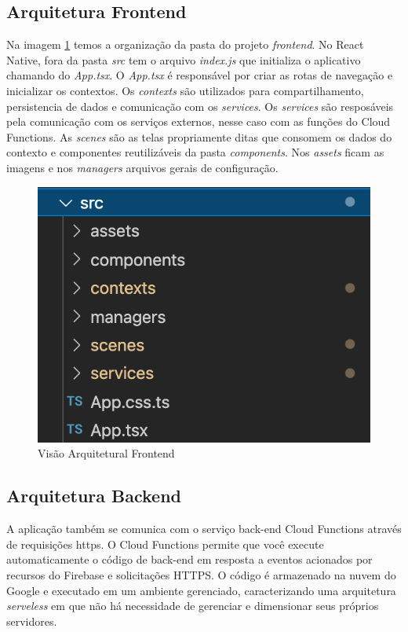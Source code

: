 \subsection{Arquitetura Frontend}

Na imagem \ref{fig13} temos a organização da pasta do projeto \emph{frontend}. No React Native, fora 
da pasta \emph{src} tem o arquivo \emph{index.js} que initializa o aplicativo chamando do \emph{App.tsx}. 
O \emph{App.tsx} é responsável 
por criar as rotas de navegação e inicializar os contextos. Os \emph{contexts} são utilizados 
para compartilhamento, 
persistencia de dados e comunicação com os \emph{services}. Os \emph{services} são resposáveis pela 
comunicação com 
os serviços externos, nesse caso com as funções do Cloud Functions. As \emph{scenes} são as 
telas propriamente ditas 
que consomem os dados do contexto e componentes reutilizáveis da pasta \emph{components}. 
Nos \emph{assets} ficam as imagens e 
nos \emph{managers} arquivos gerais de configuração. 


\begin{figure}[ht]
    \centering
    \includegraphics[keepaspectratio=true,scale=0.6]{figuras/frontend.png}
    \caption{Visão Arquitetural Frontend}
        \label{fig13}
\end{figure}
\subsection{Arquitetura Backend}

A aplicação também se comunica com o serviço back-end Cloud Functions através de requisições https.
O Cloud Functions permite que você execute automaticamente o código de back-end em resposta a 
eventos acionados por recursos do Firebase e solicitações HTTPS. 
O código é armazenado na nuvem do Google e executado em um ambiente gerenciado, caracterizando 
uma arquitetura \emph{serveless} em que não há necessidade de gerenciar e dimensionar seus 
próprios servidores. 

